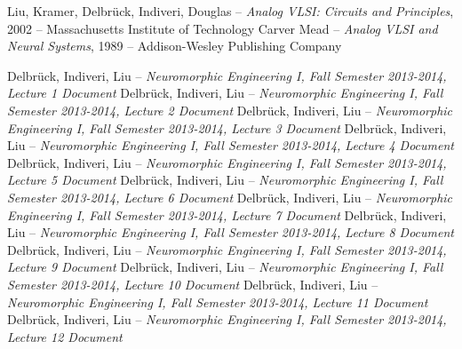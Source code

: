 \documentclass[main]{subfiles}
\begin{document}
\begin{thebibliography}{7}

Liu, Kramer, Delbrück, Indiveri, Douglas -- \emph{Analog VLSI: Circuits and Principles}, 2002 -- Massachusetts Institute of Technology
Carver Mead -- \emph{Analog VLSI and Neural Systems}, 1989 -- Addison-Wesley Publishing Company


Delbrück, Indiveri, Liu -- \emph{Neuromorphic Engineering I, Fall Semester 2013-2014, Lecture 1 Document}
Delbrück, Indiveri, Liu -- \emph{Neuromorphic Engineering I, Fall Semester 2013-2014, Lecture 2 Document}
Delbrück, Indiveri, Liu -- \emph{Neuromorphic Engineering I, Fall Semester 2013-2014, Lecture 3 Document}
Delbrück, Indiveri, Liu -- \emph{Neuromorphic Engineering I, Fall Semester 2013-2014, Lecture 4 Document}
Delbrück, Indiveri, Liu -- \emph{Neuromorphic Engineering I, Fall Semester 2013-2014, Lecture 5 Document}
Delbrück, Indiveri, Liu -- \emph{Neuromorphic Engineering I, Fall Semester 2013-2014, Lecture 6 Document}
Delbrück, Indiveri, Liu -- \emph{Neuromorphic Engineering I, Fall Semester 2013-2014, Lecture 7 Document}
Delbrück, Indiveri, Liu -- \emph{Neuromorphic Engineering I, Fall Semester 2013-2014, Lecture 8 Document}
Delbrück, Indiveri, Liu -- \emph{Neuromorphic Engineering I, Fall Semester 2013-2014, Lecture 9 Document}
Delbrück, Indiveri, Liu -- \emph{Neuromorphic Engineering I, Fall Semester 2013-2014, Lecture 10 Document}
Delbrück, Indiveri, Liu -- \emph{Neuromorphic Engineering I, Fall Semester 2013-2014, Lecture 11 Document}
Delbrück, Indiveri, Liu -- \emph{Neuromorphic Engineering I, Fall Semester 2013-2014, Lecture 12 Document}


\end{thebibliography}
\end{document}
